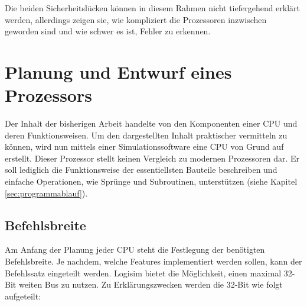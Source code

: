 \documentclass[a4paper,12pt]{article}
\begin{document}
\par\bigskip\noindent Die beiden Sicherheitslücken können in diesem Rahmen nicht tiefergehend erklärt werden, allerdings zeigen sie, wie kompliziert die Prozessoren inzwischen geworden sind und wie schwer es ist, Fehler zu erkennen. 


\newpage
\section{Planung und Entwurf eines Prozessors}
Der Inhalt der bisherigen Arbeit handelte von den Komponenten einer CPU und deren Funktionsweisen. Um den dargestellten Inhalt praktischer vermitteln zu können, wird nun mittels einer Simulationssoftware eine CPU von Grund auf erstellt. Dieser Prozessor stellt keinen Vergleich zu modernen Prozessoren dar. Er soll lediglich die Funktionsweise der essentiellsten Bauteile beschreiben und einfache Operationen, wie Sprünge und Subroutinen, unterstützen (siehe Kapitel \ref{sec:programmablauf}).
\subsection{Befehlsbreite}
Am Anfang der Planung jeder CPU steht die Festlegung der benötigten Befehlsbreite. Je nachdem, welche Features implementiert werden sollen, kann der Befehlssatz eingeteilt werden. Logisim bietet die Möglichkeit, einen maximal 32-Bit weiten Bus zu nutzen. Zu Erklärungszwecken werden die 32-Bit wie folgt aufgeteilt:
\end{document}
